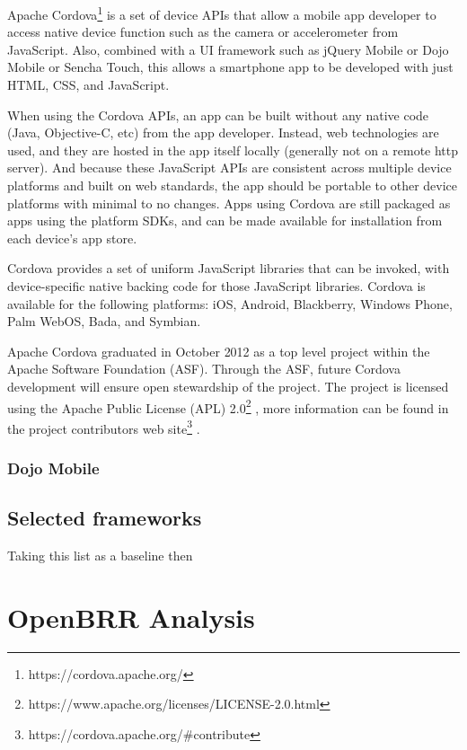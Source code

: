\documentclass[a4paper,12pt]{book}
\begin{document}
Apache Cordova\footnote{https://cordova.apache.org/} is a set of device APIs that allow a mobile app developer to access native device function such as the camera or accelerometer from JavaScript. Also, combined with a UI framework such as jQuery Mobile or Dojo Mobile or Sencha Touch, this allows a smartphone app to be developed with just HTML, CSS, and JavaScript.

When using the Cordova APIs, an app can be built without any native code (Java, Objective-C, etc) from the app developer. Instead, web technologies are used, and they are hosted in the app itself locally (generally not on a remote http server). And because these JavaScript APIs are consistent across multiple device platforms and built on web standards, the app should be portable to other device platforms with minimal to no changes.
Apps using Cordova are still packaged as apps using the platform SDKs, and can be made available for installation from each device's app store.

Cordova provides a set of uniform JavaScript libraries that can be invoked, with device-specific native backing code for those JavaScript libraries. Cordova is available for the following platforms: iOS, Android, Blackberry, Windows Phone, Palm WebOS, Bada, and Symbian.

Apache Cordova graduated in October 2012 as a top level project within the Apache Software Foundation (ASF). Through the ASF, future Cordova development will ensure open stewardship of the project. The project is licensed using the Apache Public License (APL) 2.0\footnote{https://www.apache.org/licenses/LICENSE-2.0.html} , more information can be found in the project contributors web site\footnote{https://cordova.apache.org/\#contribute} .

\subsection{Dojo Mobile}
\label{Dojo Mobile} 

\section{Selected frameworks}
\label{sec:selected}
Taking this list as a baseline then






\chapter{OpenBRR Analysis}
\label{chap:openbrr}
\end{document}
